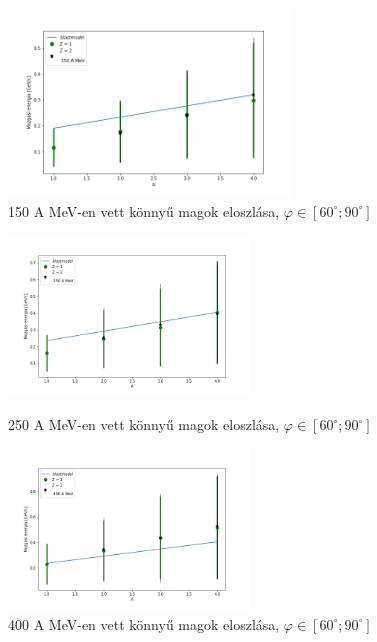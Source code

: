 \documentclass[a4paper,12pt]{article}
\begin{document}
\begin{figure}[!htb]
\begin{minipage}{\textwidth}
\centering
\includegraphics[width=0.67\textwidth]{./konnyu_magok_150AMeV.png}
\caption{150 A MeV-en vett könnyű magok eloszlása, $\varphi \in [60^{\circ};90^{\circ}]$}
\end{minipage}
\end{figure}
\begin{figure}[!htb]
\begin{minipage}{\textwidth}
\centering
\includegraphics[width=0.57\textwidth]{./konnyu_magok_250AMeV.png}
\caption{250 A MeV-en vett könnyű magok eloszlása, $\varphi \in [60^{\circ};90^{\circ}]$}
\end{minipage}
\begin{minipage}{\textwidth}
\centering
\includegraphics[width=0.57\textwidth]{./konnyu_magok_400AMeV.png}
\caption{400 A MeV-en vett könnyű magok eloszlása, $\varphi \in [60^{\circ};90^{\circ}]$}
\end{minipage}
\end{figure}
\end{document}

